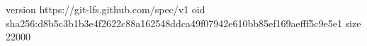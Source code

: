 version https://git-lfs.github.com/spec/v1
oid sha256:d8b5c3b1b3e4f2622c88a162548ddca49f07942e610bb85ef169aefff5c9e5e1
size 22000
